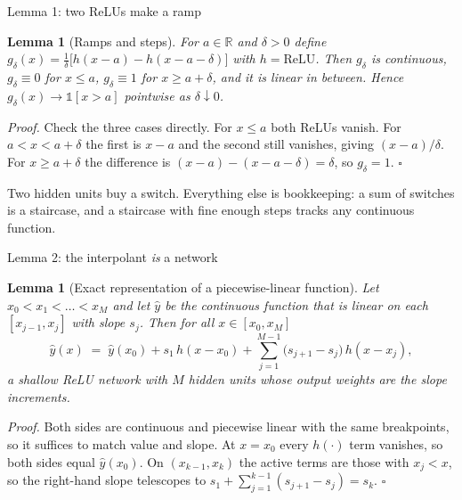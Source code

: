\documentclass[aspectratio=169, 11pt]{beamer}
\newtheorem{lemmax}[theorem]{Lemma}
\newcommand{\nosrc}{}       %
\begin{document}
\begin{frame}{Lemma 1: two ReLUs make a ramp}
  \nosrc
  \begin{lemmax}[Ramps and steps]
    For $a\in\mathbb{R}$ and $\delta>0$ define
    $g_{\delta}(x)=\frac{1}{\delta}\big[h(x-a)-h(x-a-\delta)\big]$
    with $h=\mathrm{ReLU}$. Then $g_{\delta}$ is continuous,
    $g_{\delta}\equiv 0$ for $x\le a$, $g_{\delta}\equiv 1$ for
    $x\ge a+\delta$, and it is linear in between. Hence
    $g_{\delta}(x)\to\mathbb{1}[x>a]$ pointwise as
    $\delta\downarrow 0$.
  \end{lemmax}
  \vspace{0.2em}
  {\footnotesize
  \emph{Proof.} Check the three cases directly.
  For $x\le a$ both ReLUs vanish. For $a<x<a+\delta$ the first is
  $x-a$ and the second still vanishes, giving $(x-a)/\delta$. For
  $x\ge a+\delta$ the difference is
  $(x-a)-(x-a-\delta)=\delta$, so $g_{\delta}=1$. \hfill$\square$}
  \vspace{0.4em}
  \begin{redhighlight}
    {\small Two hidden units buy a \alert{switch}. Everything else is
    bookkeeping: a sum of switches is a staircase, and a staircase
    with fine enough steps tracks any continuous function.}
  \end{redhighlight}
\end{frame}

\begin{frame}{Lemma 2: the interpolant \emph{is} a network}
  \nosrc
  \begin{lemmax}[Exact representation of a piecewise-linear function]
    {\small Let $x_0<x_1<\dots<x_M$ and let $\hat y$ be the continuous
    function that is linear on each $[x_{j-1},x_j]$ with slope
    $s_j$. Then for all $x\in[x_0,x_M]$
    \[
      \hat y(x) \;=\; \hat y(x_0) + s_1\,h(x-x_0)
      + \sum_{j=1}^{M-1}\big(s_{j+1}-s_j\big)\,h(x-x_j),
    \]
    a shallow ReLU network with $M$ hidden units whose output weights
    are the \alert{slope increments}.}
  \end{lemmax}
  \vspace{0.1em}
  {\scriptsize
  \emph{Proof.} Both sides are continuous and piecewise linear with the
  same breakpoints, so it suffices to match value and slope. At $x=x_0$
  every $h(\cdot)$ term vanishes, so both sides equal $\hat y(x_0)$. On
  $(x_{k-1},x_k)$ the active terms are those with $x_j<x$, so the
  right-hand slope telescopes to
  $s_1+\sum_{j=1}^{k-1}(s_{j+1}-s_j)=s_k$. \hfill$\square$}
\end{frame}
\end{document}

